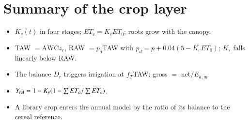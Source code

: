 \section{Summary of the crop layer}
\begin{itemize}
\item $K_c(t)$ in four stages; $ET_c=K_cET_0$; roots grow with the canopy.
\item TAW $=\mathrm{AWC}z_r$, RAW $=p_d$TAW with $p_d=p+0.04(5-K_cET_0)$; $K_s$ falls linearly below RAW.
\item The balance $D_r$ triggers irrigation at $f_T$TAW; gross $=$ net$/E_{a,m}$.
\item $Y_{\rm rel}=1-K_y(1-\sum ET_a/\sum ET_c)$.
\item A library crop enters the annual model by the ratio of its balance to the cereal reference.
\end{itemize}
